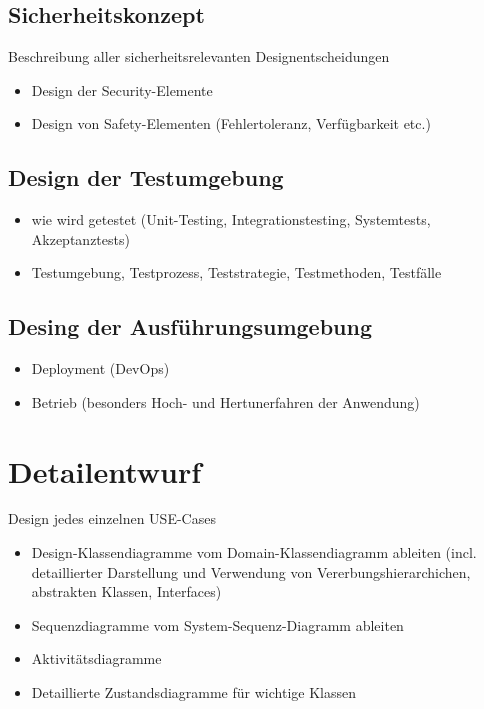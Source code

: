 \subsection{Sicherheitskonzept}
Beschreibung aller sicherheitsrelevanten Designentscheidungen

\begin{itemize}
	\item Design der Security-Elemente
	\item Design von Safety-Elementen (Fehlertoleranz, Verfügbarkeit etc.)
\end{itemize}

\subsection{Design der Testumgebung}
\begin{itemize}
	\item wie wird getestet (Unit-Testing, Integrationstesting, Systemtests, Akzeptanztests)
	\item Testumgebung, Testprozess, Teststrategie, Testmethoden, Testfälle
\end{itemize}


\subsection{Desing der Ausführungsumgebung}
\begin{itemize}
	\item Deployment (DevOps)
	\item Betrieb (besonders Hoch- und Hertunerfahren der Anwendung)
\end{itemize}

\section{Detailentwurf}

Design jedes einzelnen USE-Cases

\begin{itemize}
	\item Design-Klassendiagramme vom Domain-Klassendiagramm ableiten (incl. detaillierter Darstellung und Verwendung von Vererbungshierarchichen, abstrakten Klassen, Interfaces)
	\item Sequenzdiagramme vom System-Sequenz-Diagramm ableiten
	\item Aktivitätsdiagramme
	\item Detaillierte Zustandsdiagramme für wichtige Klassen
\end{itemize}

